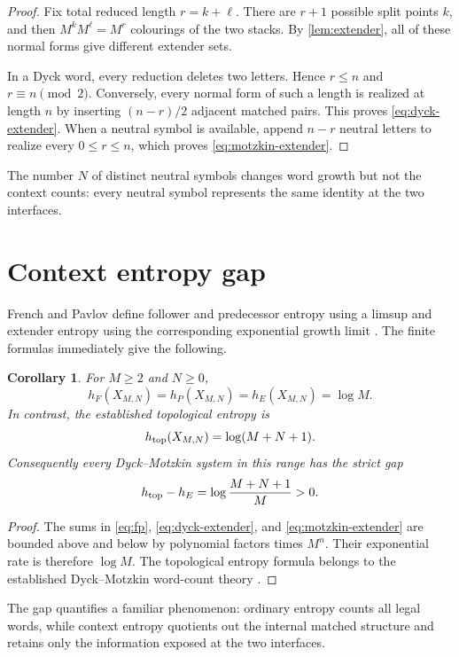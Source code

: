 \documentclass[11pt,a4paper]{amsart}
\newtheorem{corollary}[theorem]{Corollary}
\theoremstyle{definition}
\theoremstyle{remark}
\begin{document}
\begin{proof}
Fix total reduced length $r=k+\ell$.  There are $r+1$ possible split points
$k$, and then $M^kM^\ell=M^r$ colourings of the two stacks.  By
\cref{lem:extender}, all of these normal forms give different extender sets.

In a Dyck word, every reduction deletes two letters.  Hence $r\leq n$ and
$r\equiv n\pmod2$.  Conversely, every normal form of such a length is realized
at length $n$ by inserting $(n-r)/2$ adjacent matched pairs.  This proves
\eqref{eq:dyck-extender}.  When a neutral symbol is available, append
$n-r$ neutral letters to realize every $0\leq r\leq n$, which proves
\eqref{eq:motzkin-extender}.
\end{proof}

The number $N$ of distinct neutral symbols changes word growth but not the
context counts: every neutral symbol represents the same identity at the two
interfaces.

\section{Context entropy gap}

French and Pavlov define follower and predecessor entropy using a limsup and
extender entropy using the corresponding exponential growth limit
\cite{FrenchPavlov2019}.  The finite formulas immediately give the following.

\begin{corollary}\label{cor:entropy}
For $M\geq2$ and $N\geq0$,
\[
 h_F(X_{M,N})=h_P(X_{M,N})=h_E(X_{M,N})=\log M.
\]
In contrast, the established topological entropy is
\[
 h_{\rm top}(X_{M,N})=\log(M+N+1).
\]
Consequently every Dyck--Motzkin system in this range has the strict gap
\[
 h_{\rm top}-h_E=\log\frac{M+N+1}{M}>0.
\]
\end{corollary}

\begin{proof}
The sums in \eqref{eq:fp}, \eqref{eq:dyck-extender}, and
\eqref{eq:motzkin-extender} are bounded above and below by polynomial factors
times $M^n$.  Their exponential rate is therefore $\log M$.  The topological
entropy formula belongs to the established Dyck--Motzkin word-count theory
\cite{Inoue2010,KriegerMatsumoto2011}.
\end{proof}

The gap quantifies a familiar phenomenon: ordinary entropy counts all legal
words, while context entropy quotients out the internal matched structure and
retains only the information exposed at the two interfaces.
\end{document}

